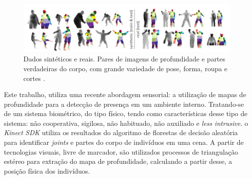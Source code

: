\begin{figure}[ht]
\centering
\includegraphics[resolution=300,width=1.0\textwidth,natwidth=610,natheight=642]{images/body_parts.png}
    \caption{Dados sintéticos e reais. Pares de imagens de profundidade e partes verdadeiras do corpo, com grande variedade de pose, forma, roupa e cortes \cite{Shotton:2013:RHP:2398356.2398381}.}
    \label{fig:bodyparts}
\end{figure}


Este trabalho, utiliza uma recente abordagem sensorial: a utilização de mapas de profundidade para a detecção de presença em um ambiente interno. Tratando-se de um sistema biométrico, do tipo físico, tendo como características desse tipo de sistema: não cooperativa, sigilosa, não habituado, não auxiliado e \textit{less intrusive}. o \textit{Kinect SDK} utiliza os resultados do algoritmo de florestas de decisão aleatória para identificar \textit{joints} e partes do corpo de indivíduos em uma cena. A partir de tecnologias visuais, livre de marcador, são utilizados processos de triangulação estéreo para extração do mapa de profundidade, calculando a partir desse, a posição física dos indivíduos.